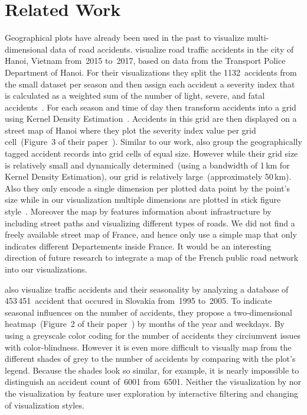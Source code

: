 \section{Related Work}
Geographical plots have already been used in the past to visualize multi-dimensional data of road accidents.
\textcite{LeLL2020} visualize road traffic accidents in the city of Hanoi, Vietnam from~2015 to~2017, based on data from the Transport Police Department of Hanoi.
For their visualizations they split the 1132~accidents from the small dataset per season and then assign each accident a severity index that is calculated as a weighted sum of the number of light, severe, and fatal accidents~\cite{GeurtsWBV2004}.
For each season and time of day \citeauthor{LeLL2020} then transform accidents into a grid using Kernel Density Estimation~\cite{Anderson2009}. Accidents in this grid are then displayed on a street map of Hanoi where they plot the severity index value per grid cell~(Figure~3 of their paper~\cite{LeLL2020}).
Similar to our work, \citeauthor{LeLL2020} also group the geographically tagged accident records into grid cells of equal size. However while their grid size is relatively small and dynamically determined~(using a bandwidth of 1\,km for Kernel Density Estimation), our grid is relatively large~(approximately 50\,km). Also they only encode a single dimension per plotted data point by the point's size while in our visualization multiple dimensions are plotted in stick figure style~\cite{PickettG1988}.
Moreover the map by \citeauthor{LeLL2020} features information about infrastructure by including street paths and visualizing different types of roads. We did not find a freely available street map of France, and hence only use a simple map that only indicates different Departements inside France. It would be an interesting direction of future research to integrate a map of the French public road network into our visualizations.

\textcite{LavravcJTK2008} also visualize traffic accidents and their seasonality by analyzing a database of 453\,451~accident that occured in Slovakia from~1995 to~2005.
To indicate seasonal influences on the number of accidents, they propose a two-dimensional heatmap~(Figure~2 of their paper~\cite{LavravcJTK2008}) by months of the year and weekdays. By using a greyscale color coding for the number of accidents they circiumvent issues with color-blindness. However it is even more difficult to visually map from the different shades of grey to the number of accidents by comparing with the plot's legend. Because the shades look so similar, for example, it is nearly impossible to distinguish an accident count of~6001 from~6501.
Neither the visualization by \citeauthor{LavravcJTK2008} nor the visualization by  feature user exploration by interactive filtering and changing of visualization styles.
